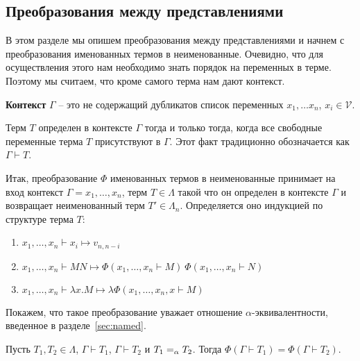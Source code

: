 \subsection{Преобразования между представлениями}

В этом разделе мы опишем преобразования между представлениями и начнем с преобразования именованных термов в неименованные. Очевидно, что для осуществления этого нам необходимо знать порядок на переменных в терме. Поэтому мы считаем, что кроме самого терма нам дают контекст.

\begin{definition}
  \textbf{Контекст} $\Gamma$ -- это не содержащий дубликатов список переменных $x_{1}, \dots x_{n}$, $x_{i} \in \mathcal{V}$.
\end{definition}

\begin{definition}
  Терм $T$ определен в контексте $\Gamma$ тогда и только тогда, когда все свободные переменные терма $T$ присутствуют в $\Gamma$. Этот факт традиционно обозначается как $\Gamma \vdash T$.
\end{definition}

Итак, преобразование $\Phi$ именованных термов в неименованные принимает на вход контекст $\Gamma = x_{1}, \dots, x_{n}$, терм $T \in \Lambda$  такой что он определен в контексте $\Gamma$ и возвращает неименованный терм $T' \in \Lambda_{n}$. Определяется оно индукцией по структуре терма $T$:

\begin{enumerate}
  \item $x_{1}, \dots, x_{n} \vdash x_{i} \mapsto v_{n, n - i}$
  \item $x_{1}, \dots, x_{n} \vdash M N \mapsto \Phi(x_{1}, \dots, x_{n} \vdash M)\ \Phi(x_{1}, \dots, x_{n} \vdash N)$
  \item $x_{1}, \dots, x_{n} \vdash \lambda x.M \mapsto \lambda \Phi(x_{1}, \dots, x_{n} , x \vdash M)$
\end{enumerate}

Покажем, что такое преобразование уважает отношение $\alpha$-эквивалентности, введенное в разделе~\ref{sec:named}.

\begin{prop}
  Пусть $T_{1}, T_{2} \in \Lambda$, $\Gamma \vdash T_{1}$, $\Gamma \vdash T_{2}$ и $T_{1} =_{\alpha} T_{2}$. Тогда $\Phi(\Gamma \vdash T_{1}) = \Phi(\Gamma \vdash T_{2})$.
\end{prop}

